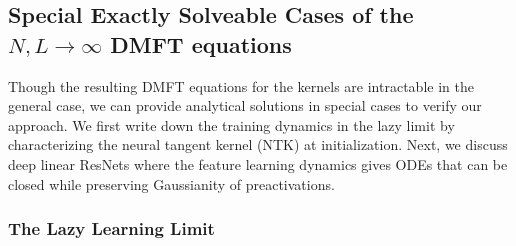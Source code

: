 \documentclass{article} %
\def\x{\bm x}
\begin{document}

\subsection{Special Exactly Solveable Cases of the $N,L\to\infty$ DMFT equations}
\label{subsec:special_exactly_solveable}

 Though the resulting DMFT equations for the kernels are intractable in the general case, we can provide analytical solutions in special cases to verify our approach. We first write down the training dynamics in the lazy limit by characterizing the neural tangent kernel (NTK) at initialization. Next, we discuss deep linear ResNets where the feature learning dynamics gives ODEs that can be closed while preserving Gaussianity of preactivations. 


\subsubsection{The Lazy Learning Limit}\label{sec:lazy_limit}
\end{document}
